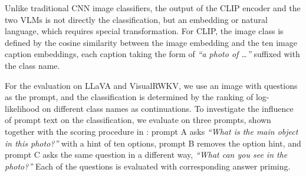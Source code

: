 \documentclass[conference]{IEEEtran}
\begin{document}
Unlike traditional CNN image classifiers, the output of the CLIP encoder
and the two VLMs is not directly the classification, but an embedding or
natural language, which requires special transformation. For CLIP, the
image class is defined by the cosine similarity between the image embedding
and the ten image caption embeddings, each caption taking the form of
\textit{``a photo of \dots''} suffixed with the class name.

For the evaluation on LLaVA and VisualRWKV, we use an image with questions
as the prompt, and the classification is determined by the ranking of
log-likelihood on different class names as continuations. To investigate
the influence of prompt text on the classification, we evaluate on three
prompts, shown together with the scoring procedure in :
prompt A asks \textit{``What is the main object in this photo?''} with a
hint of ten options, prompt B removes the option hint, and prompt C asks
the same question in a different way, \textit{``What can you see in the
photo?''} Each of the questions is evaluated with corresponding answer
priming.
\end{document}
